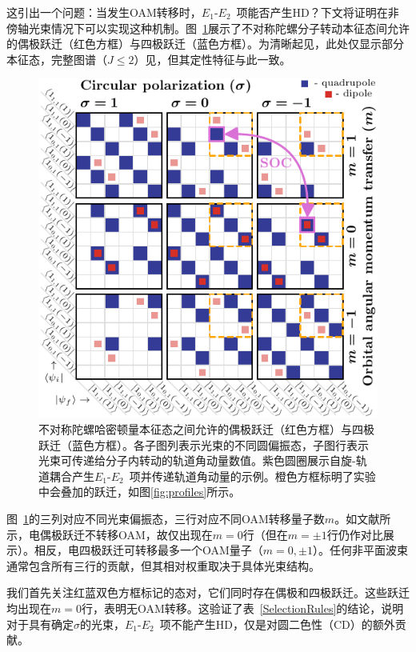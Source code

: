 \documentclass[reprint,aps,prl,twocolumn,superscriptaddress,groupedaddress]{revtex4-2}
\newcommand{\eoet}{$E_1$-$E_2$}
\begin{document}
这引出一个问题：当发生OAM转移时，\eoet~项能否产生HD？下文将证明在非傍轴光束情况下可以实现这种机制。图~\ref{fig:gridJ1}展示了不对称陀螺分子转动本征态间允许的偶极跃迁（红色方框）与四极跃迁（蓝色方框）。为清晰起见，此处仅显示部分本征态，完整图谱（$J\leq 2$）见\cite{Note1}，但其定性特征与此一致。

\begin{figure}[ht!]
    \centering
    \includegraphics[width=\linewidth]{Figure1.pdf}
    \caption{不对称陀螺哈密顿量本征态之间允许的偶极跃迁（红色方框）与四极跃迁（蓝色方框）。各子图列表示光束的不同圆偏振态，子图行表示光束可传递给分子内转动的轨道角动量数值。紫色圆圈展示自旋-轨道耦合产生\eoet~项并传递轨道角动量的示例。橙色方框标明了实验中会叠加的跃迁，如图\ref{fig:profiles}所示。}
    \label{fig:gridJ1}
\end{figure}
图~\ref{fig:gridJ1}的三列对应不同光束偏振态，三行对应不同OAM转移量子数$m$。如文献\cite{Maslov2024,Maslov_Thesis}所示，电偶极跃迁不转移OAM，故仅出现在$m=0$行（但在$m=\pm 1$行仍作对比展示）。相反，电四极跃迁可转移最多一个OAM量子（$m=0,\pm 1$）。任何非平面波束通常包含所有三行的贡献，但其相对权重取决于具体光束结构。

我们首先关注红蓝双色方框标记的态对，它们同时存在偶极和四极跃迁。这些跃迁均出现在$m=0$行，表明无OAM转移。这验证了表~\ref{SelectionRules}的结论，说明对于具有确定$\sigma$的光束，\eoet~项不能产生HD，仅是对圆二色性（CD）的额外贡献。
\end{document}
